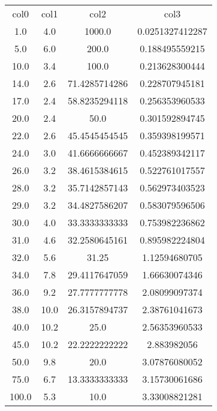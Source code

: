 \begin{table}
\begin{tabular}{cccc}
col0 & col1 & col2 & col3 \\
1.0 & 4.0 & 1000.0 & 0.0251327412287 \\
5.0 & 6.0 & 200.0 & 0.188495559215 \\
10.0 & 3.4 & 100.0 & 0.213628300444 \\
14.0 & 2.6 & 71.4285714286 & 0.228707945181 \\
17.0 & 2.4 & 58.8235294118 & 0.256353960533 \\
20.0 & 2.4 & 50.0 & 0.301592894745 \\
22.0 & 2.6 & 45.4545454545 & 0.359398199571 \\
24.0 & 3.0 & 41.6666666667 & 0.452389342117 \\
26.0 & 3.2 & 38.4615384615 & 0.522761017557 \\
28.0 & 3.2 & 35.7142857143 & 0.562973403523 \\
29.0 & 3.2 & 34.4827586207 & 0.583079596506 \\
30.0 & 4.0 & 33.3333333333 & 0.753982236862 \\
31.0 & 4.6 & 32.2580645161 & 0.895982224804 \\
32.0 & 5.6 & 31.25 & 1.12594680705 \\
34.0 & 7.8 & 29.4117647059 & 1.66630074346 \\
36.0 & 9.2 & 27.7777777778 & 2.08099097374 \\
38.0 & 10.0 & 26.3157894737 & 2.38761041673 \\
40.0 & 10.2 & 25.0 & 2.56353960533 \\
45.0 & 10.2 & 22.2222222222 & 2.883982056 \\
50.0 & 9.8 & 20.0 & 3.07876080052 \\
75.0 & 6.7 & 13.3333333333 & 3.15730061686 \\
100.0 & 5.3 & 10.0 & 3.33008821281 \\
\end{tabular}
\end{table}
